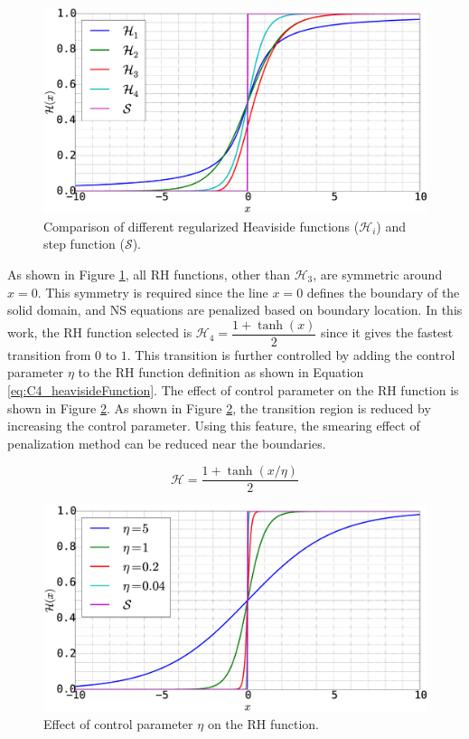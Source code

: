 \begin{figure}[H]
    \centering
    \includegraphics[width=12.00cm]{Chapter_4/figure/heaviside_function_example.eps}
    \caption{Comparison of different regularized Heaviside functions ($\mathcal{H}_i$) and step function ($\mathcal{S}$).}
    \label{fig:C4_heavisideFunctionExample}
\end{figure}

As shown in Figure \ref{fig:C4_heavisideFunctionExample}, all RH functions, other than $\mathcal{H}_3$, are symmetric around $x = 0$. This symmetry is required since the line $x = 0$ defines the boundary of the solid domain, and NS equations are penalized based on boundary location. In this work, the RH function selected is $\mathcal{H}_4 = \dfrac{1 + \tanh(x)}{2}$ since it gives the fastest transition from $0$ to $1$. This transition is further controlled by adding the control parameter $\eta$ to the RH function definition as shown in Equation \eqref{eq:C4_heavisideFunction}. The effect of control parameter on the RH function is shown in Figure \ref{fig:C4_heavisideFunctionWithControlParamter}. As shown in Figure \ref{fig:C4_heavisideFunctionWithControlParamter}, the transition region is reduced by increasing the control parameter. Using this feature, the smearing effect of penalization method can be reduced near the boundaries.

\begin{equation}\label{eq:C4_heavisideFunction}
    \mathcal{H} = \frac{1 + \tanh(x / \eta)}{2}
\end{equation}

\begin{figure}[H]
    \centering
    \includegraphics[width=12.00cm]{Chapter_4/figure/heaviside_function_with_control.eps}
    \caption{Effect of control parameter $\eta$ on the RH function.}
    \label{fig:C4_heavisideFunctionWithControlParamter}
\end{figure}

